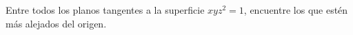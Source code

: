 \item Entre todos los planos tangentes a la superficie $xyz^2 = 1$, encuentre los que estén más alejados del origen.
